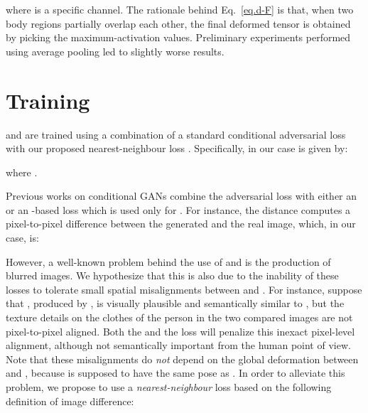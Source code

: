 \documentclass[10pt,twocolumn,letterpaper]{article}
\begin{document}
\noindent
where  is a specific channel.
The rationale behind Eq.~\ref{eq.d-F} is that, when two body regions partially overlap each other, the final deformed tensor  is obtained by picking the  maximum-activation values. Preliminary experiments performed using  average pooling  led to slightly worse results.

\section{Training}
\label{Training}

 and  are trained using a combination of a standard conditional adversarial loss  with our proposed nearest-neighbour loss . Specifically, in our case 
 is given by:







\noindent
where . 

Previous works on conditional GANs  combine the adversarial loss with either an   \cite{DBLP:journals/corr/PathakKDDE16} or an -based loss \cite{pix2pix2016,ma2017pose} which is used only for . For instance, the  distance computes a pixel-to-pixel difference between the generated and the real image, which, in our case, is:



\noindent
However,
a well-known problem behind the use of  and  is the production of blurred images.
We hypothesize that this is also due to the inability of these losses to tolerate small spatial misalignments between  and . For instance, suppose that 
, produced by , is visually plausible and semantically similar to , but the texture details on the clothes of the person in the two compared images are not pixel-to-pixel aligned. Both the  and the  loss will penalize this inexact pixel-level alignment, although not semantically important from the human point of view.
 Note that these misalignments do {\em not} depend on the global deformation between  and , because   is supposed to have the same pose as . In order to alleviate this problem, we propose to use a {\em nearest-neighbour} loss  based on the following definition of image difference:
\end{document}
